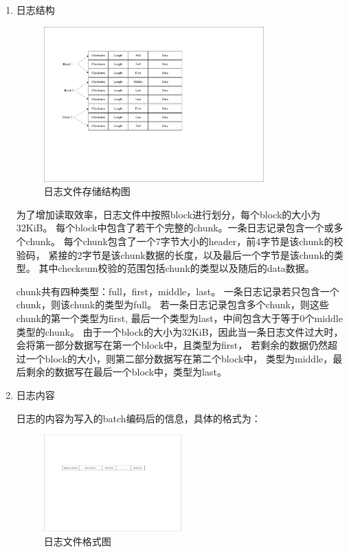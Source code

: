    \begin{enumerate}
   \item 日志结构

   \begin{figure}[H]
	   \centering
	   \includegraphics[width=0.80\textwidth]{pdf/journal.pdf}
	   \caption{日志文件存储结构图}
	   \label{journal}
   \end{figure}
   为了增加读取效率，日志文件中按照block进行划分，每个block的大小为32KiB。
   每个block中包含了若干个完整的chunk。一条日志记录包含一个或多个chunk。
   每个chunk包含了一个7字节大小的header，前4字节是该chunk的校验码，
   紧接的2字节是该chunk数据的长度，以及最后一个字节是该chunk的类型。
   其中checksum校验的范围包括chunk的类型以及随后的data数据。

   chunk共有四种类型：full，first，middle，last。
   一条日志记录若只包含一个chunk，则该chunk的类型为full。
   若一条日志记录包含多个chunk，则这些chunk的第一个类型为first, 
   最后一个类型为last，中间包含大于等于0个middle类型的chunk。
   由于一个block的大小为32KiB，因此当一条日志文件过大时，
   会将第一部分数据写在第一个block中，且类型为first，
   若剩余的数据仍然超过一个block的大小，则第二部分数据写在第二个block中，
   类型为middle，最后剩余的数据写在最后一个block中，类型为last。
   
   \item 日志内容
   
   日志的内容为写入的batch编码后的信息，具体的格式为：
   \begin{figure}[H]
	   \centering
	   \includegraphics[width=0.50\textwidth]{pdf/journal_content.pdf}
	   \caption{日志文件格式图}
	   \label{journal_content}
   \end{figure}


\end{enumerate}
